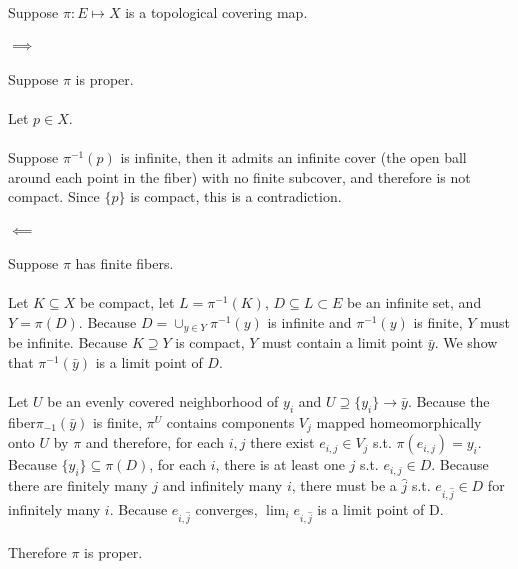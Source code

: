 Suppose $\pi:E\mapsto X$ is a topological covering map.
\\\\
$\implies$ 
\\\\
Suppose $\pi$ is proper.
\\\\
Let $p \in X$.  
\\\\
Suppose $\pi^{-1}(p)$ is infinite, then it admits an infinite cover (the open ball around each point in the fiber) with no finite subcover, and therefore is not compact.  Since $\{p\}$ is compact, this is a contradiction.
\\\\
$\impliedby$ 
\\\\
Suppose $\pi$ has finite fibers.  
\\\\
Let $K \subseteq X$ be compact, let $L = \pi^{-1}(K)$, $D\subseteq L \subset E$ be an infinite set, and $Y = \pi(D)$. Because $D = \cup_{y\in Y}  \pi^{-1}(y)$ is infinite and $\pi^{-1}(y)$ is finite, $Y$ must be infinite.  Because $K\supseteq Y$ is compact, $Y$ must contain a limit point $\bar{y}$.  We show that $\pi^{-1}(\bar{y})$ is a limit point of $D$.
\\\\
Let $U$ be an evenly covered neighborhood of $y_i$ and $U \supseteq \{y_i\} \to \bar{y}$.  Because the fiber$\pi_{-1}(\bar{y})$ is finite, $\pi^{U}$ contains components $V_j$ mapped homeomorphically onto $U$ by $\pi$ and therefore, for each $i,j$ there exist $e_{i,j}\in V_j$ s.t. $\pi(e_{i,j}) = y_i$.  Because $\{y_i\} \subseteq \pi(D)$, for each $i$, there is at least one $j$ s.t. $e_{i,j} \in D$.  Because there are finitely many $j$ and infinitely many $i$, there must be a $\hat{j}$ s.t. $e_{i,\hat{j}} \in D$ for infinitely many $i$.  Because $e_{i,\hat{j}}$ converges, $\lim_i e_{i,\hat{j}}$ is a limit point of D.
\\\\
Therefore $\pi$ is proper.